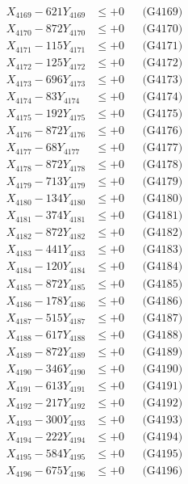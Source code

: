\documentclass[a4paper,10pt]{article}
\begin{document}
{\begin{align}
X_{4169} - 621Y_{4169} &\leq +0 && \text{(G4169)} \\
X_{4170} - 872Y_{4170} &\leq +0 && \text{(G4170)} \\
\allowbreak
X_{4171} - 115Y_{4171} &\leq +0 && \text{(G4171)} \\
X_{4172} - 125Y_{4172} &\leq +0 && \text{(G4172)} \\
X_{4173} - 696Y_{4173} &\leq +0 && \text{(G4173)} \\
X_{4174} - 83Y_{4174} &\leq +0 && \text{(G4174)} \\
X_{4175} - 192Y_{4175} &\leq +0 && \text{(G4175)} \\
X_{4176} - 872Y_{4176} &\leq +0 && \text{(G4176)} \\
X_{4177} - 68Y_{4177} &\leq +0 && \text{(G4177)} \\
X_{4178} - 872Y_{4178} &\leq +0 && \text{(G4178)} \\
X_{4179} - 713Y_{4179} &\leq +0 && \text{(G4179)} \\
X_{4180} - 134Y_{4180} &\leq +0 && \text{(G4180)} \\
\allowbreak
X_{4181} - 374Y_{4181} &\leq +0 && \text{(G4181)} \\
X_{4182} - 872Y_{4182} &\leq +0 && \text{(G4182)} \\
X_{4183} - 441Y_{4183} &\leq +0 && \text{(G4183)} \\
X_{4184} - 120Y_{4184} &\leq +0 && \text{(G4184)} \\
X_{4185} - 872Y_{4185} &\leq +0 && \text{(G4185)} \\
X_{4186} - 178Y_{4186} &\leq +0 && \text{(G4186)} \\
X_{4187} - 515Y_{4187} &\leq +0 && \text{(G4187)} \\
X_{4188} - 617Y_{4188} &\leq +0 && \text{(G4188)} \\
X_{4189} - 872Y_{4189} &\leq +0 && \text{(G4189)} \\
X_{4190} - 346Y_{4190} &\leq +0 && \text{(G4190)} \\
\allowbreak
X_{4191} - 613Y_{4191} &\leq +0 && \text{(G4191)} \\
X_{4192} - 217Y_{4192} &\leq +0 && \text{(G4192)} \\
X_{4193} - 300Y_{4193} &\leq +0 && \text{(G4193)} \\
X_{4194} - 222Y_{4194} &\leq +0 && \text{(G4194)} \\
X_{4195} - 584Y_{4195} &\leq +0 && \text{(G4195)} \\
X_{4196} - 675Y_{4196} &\leq +0 && \text{(G4196)} \\

\end{align}}
\end{document}
